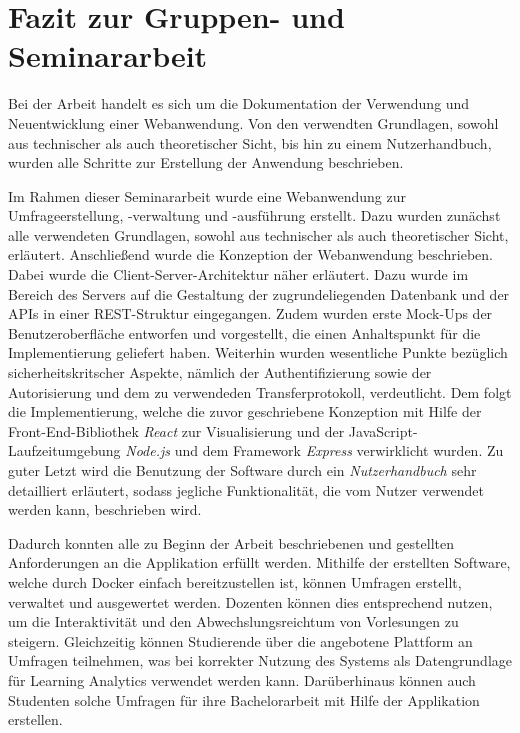 \section{Fazit zur Gruppen- und Seminararbeit}
\label{sec:Fazit}

Bei der Arbeit handelt es sich um die Dokumentation der Verwendung und Neuentwicklung einer Webanwendung.
Von den verwendten Grundlagen, sowohl aus technischer als auch theoretischer Sicht, bis hin zu einem Nutzerhandbuch, wurden alle Schritte zur Erstellung der Anwendung beschrieben.

Im Rahmen dieser Seminararbeit wurde eine Webanwendung zur Umfrageerstellung, -verwaltung und -ausführung erstellt.
Dazu wurden zunächst alle verwendeten Grundlagen, sowohl aus technischer als auch theoretischer Sicht, erläutert.
Anschließend wurde die Konzeption der Webanwendung beschrieben.
Dabei wurde die Client-Server-Architektur näher erläutert.
Dazu wurde im Bereich des Servers auf die Gestaltung der zugrundeliegenden Datenbank und der \acp{API} in einer \ac{REST}-Struktur eingegangen.
Zudem wurden erste Mock-Ups der Benutzeroberfläche entworfen und vorgestellt, die einen Anhaltspunkt für die Implementierung geliefert haben.
Weiterhin wurden wesentliche Punkte bezüglich sicherheitskritscher Aspekte, nämlich der Authentifizierung sowie der Autorisierung und dem zu verwendeden Transferprotokoll, verdeutlicht.
Dem folgt die Implementierung, welche die zuvor geschriebene Konzeption mit Hilfe der Front-End-Bibliothek \emph{React} zur Visualisierung und der JavaScript-Laufzeitumgebung \emph{Node.js} und dem Framework \emph{Express} verwirklicht wurden.
Zu guter Letzt wird die Benutzung der Software durch ein \emph{Nutzerhandbuch} sehr detailliert erläutert, sodass jegliche Funktionalität, die vom Nutzer verwendet werden kann, beschrieben wird.

Dadurch konnten alle zu Beginn der Arbeit beschriebenen und gestellten Anforderungen an die Applikation erfüllt werden.
Mithilfe der erstellten Software, welche durch Docker einfach bereitzustellen ist, können Umfragen erstellt, verwaltet und ausgewertet werden.
Dozenten können dies entsprechend nutzen, um die Interaktivität und den Abwechslungsreichtum von Vorlesungen zu steigern.
Gleichzeitig können Studierende über die angebotene Plattform an Umfragen teilnehmen, was bei korrekter Nutzung des Systems als Datengrundlage für Learning Analytics verwendet werden kann.
Darüberhinaus können auch Studenten solche Umfragen für ihre Bachelorarbeit mit Hilfe der Applikation erstellen.

